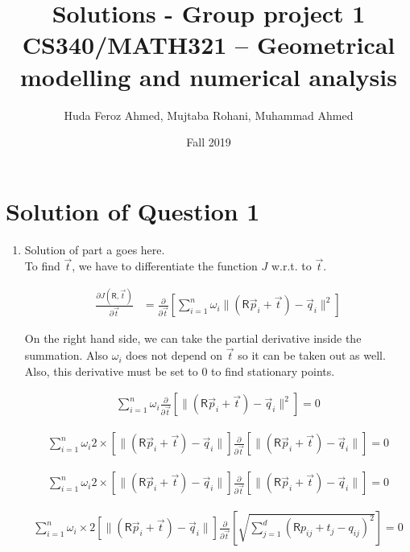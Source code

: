 \documentclass[a4paper, 11pt]{article}
\title{Solutions - Group project 1\\CS340/MATH321 -- Geometrical modelling and numerical analysis}
\date{Fall 2019}
\author{Huda Feroz Ahmed, Mujtaba Rohani, Muhammad Ahmed}
\newcommand{\mat}[1]{\boldsymbol { \mathsf{#1}} }
\newcommand{\norm}[1]{\lVert#1\rVert}
\begin{document}
\maketitle  
\setlength{\parskip}{10pt}
\setlength{\parindent}{0pt}

\section*{Solution of Question 1}
    
\begin{enumerate}[label=\alph*.]
    \item
    Solution of part a goes here.\\
    
    To find $\Vec{t}$, we have to differentiate the function $J$ w.r.t. to $\Vec{t}$.
    
    \begin{align}
        \frac{\partial J(\mat R,\Vec{t})}{\partial \Vec{t}} & = \frac{\partial}{\partial \Vec{t}} \left[ \sum_{i=1}^{n} \omega_i\norm{(\mat R\vec p_i+\vec t)-\vec q_i}^2 \right]
    \end{align}
    
    On the right hand side, we can take the partial derivative inside the summation. Also $\omega_i$ does not depend on $\vec t$ so it can be taken out as well. Also, this derivative must be set to $0$ to find stationary points.
    
    \begin{align}
         \sum_{i=1}^{n} \omega_i \frac{\partial}{\partial \Vec{t}} \left[ \norm{(\mat R\vec p_i+\vec t)-\vec q_i}^2 \right] = 0
    \end{align} 
    
    \begin{align}
         \sum_{i=1}^{n} \omega_i 2\times \left[ \norm{(\mat R\vec p_i+\vec t)-\vec q_i} \right] \frac{\partial}{\partial \Vec{t}} \left[ \norm{(\mat R\vec p_i+\vec t)-\vec q_i} \right] = 0
    \end{align}
    
    \begin{align}
         \sum_{i=1}^{n} \omega_i 2\times \left[ \norm{(\mat R\vec p_i+\vec t)-\vec q_i} \right] \frac{\partial}{\partial \Vec{t}} \left[ \norm{(\mat R\vec p_i+\vec t)-\vec q_i} \right] = 0
    \end{align}
    
    \begin{align}
         \sum_{i=1}^{n} \omega_i \times 2 \left[ \norm{(\mat R\vec p_i+\vec t)-\vec q_i} \right] \frac{\partial}{\partial \Vec{t}} \left[ \sqrt{\sum_{j=1}^d (\mat R p_{ij}+ t_j- q_{ij})^2} \right] = 0
    \end{align}
    

\end{enumerate}
\end{document}
